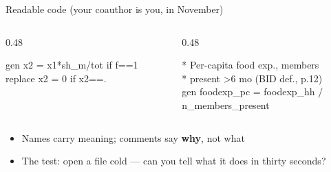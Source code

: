 \documentclass[aspectratio=169, 10pt]{beamer}
\newcommand{\aside}[2][4.2cm]{%
\begin{tikzpicture}[remember picture, overlay]
  \pgfmathsetseed{4242}%
  \node[anchor=south east, xshift=-1.5cm, yshift=0.6cm,
        fill=LightGold, rounded corners=9pt,
        text=DeepCharcoal, font=\asidefont, align=left,
        text width=#1, inner sep=9pt]
    (asidebox) at (current page.south east) {#2};
  \draw[DeepCharcoal, line width=1.0pt, rounded corners=11pt,
        decorate, decoration={random steps, segment length=10pt, amplitude=1.2pt}]
    ($(asidebox.south west)+(-2pt,-2pt)$) rectangle ($(asidebox.north east)+(2pt,2pt)$);
  \draw[DeepCharcoal!70, line width=0.6pt, rounded corners=10pt,
        decorate, decoration={random steps, segment length=14pt, amplitude=1.8pt}]
    ($(asidebox.south west)+(-3pt,-1pt)$) rectangle ($(asidebox.north east)+(1pt,3pt)$);
\end{tikzpicture}}
\begin{document}
\begin{frame}[fragile]{Readable code (your coauthor is you, in November)}

\begin{columns}[T]
\begin{column}{0.48\textwidth}
\begin{tcolorbox}[codebox]
\color{SoftCoral}\footnotesize\ttfamily
gen x2 = x1*sh\_m/tot if f==1\\
replace x2 = 0 if x2==.
\end{tcolorbox}
\end{column}
\begin{column}{0.48\textwidth}
\begin{tcolorbox}[codebox]
\color{white}\footnotesize\ttfamily
* Per-capita food exp., members\\
* present >6 mo (BID def., p.12)\\
gen foodexp\_pc = foodexp\_hh /\\
\hspace*{2em}n\_members\_present
\end{tcolorbox}
\end{column}
\end{columns}

\vspace{0.35cm}

\begin{itemize}
  \item Names carry meaning; comments say \textbf{why}, not what
  \item The test: open a file cold --- can you tell what it does in thirty seconds?
\end{itemize}


\end{frame}
\end{document}
